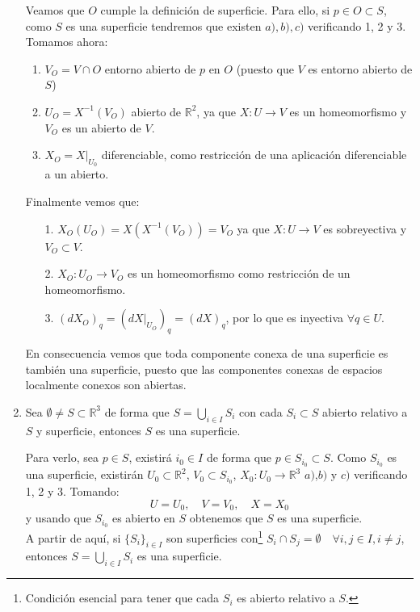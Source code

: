 \begin{ejemplo}
\begin{enumerate}
            Veamos que $O$ cumple la definición de superficie. Para ello, si $p\in O\subset S$, como $S$ es una superficie tendremos que existen $a),b),c)$ verificando 1, 2 y 3. Tomamos ahora:
            \begin{enumerate}[label=\alph*)]
                \item $V_O = V\cap O$ entorno abierto de $p$ en $O$ (puesto que $V$ es entorno abierto de $S$)
                \item $U_O = X^{-1}(V_O)$ abierto de $\mathbb{R}^2$, ya que $X:U\to V$ es un homeomorfismo y $V_O$ es un abierto de $V$.
                \item $X_O = X\big|_{U_0}$ diferenciable, como restricción de una aplicación diferenciable a un abierto.
            \end{enumerate}
            Finalmente vemos que:
            \begin{enumerate}
                \item[1.] $X_O(U_O) = X(X^{-1}(V_O)) = V_O$ ya que $X:U\to V$ es sobreyectiva y $V_O\subset V$.
                \item[2.] $X_O:U_O\to V_O$ es un homeomorfismo como restricción de un homeomorfismo.
                \item[3.] $(dX_O)_q = \left(dX\big|_{U_O}\right)_q = (dX)_q$, por lo que es inyectiva $\forall q\in U$.
            \end{enumerate}
            En consecuencia vemos que toda componente conexa de una superficie es también una superficie, puesto que las componentes conexas de espacios localmente conexos son abiertas.
        \item Sea $\emptyset \neq S\subset\mathbb{R}^3$ de forma que $S=\bigcup\limits_{i \in I}S_i$ con cada $S_i\subset S$ abierto relativo a $S$ y superficie, entonces $S$ es una superficie.

            Para verlo, sea $p\in S$, existirá $i_0\in I$ de forma que $p\in S_{i_0}\subset S$. Como $S_{i_0}$ es una superficie, existirán $U_0\subset\mathbb{R}^2$, $V_0\subset S_{i_0}$, $X_0:U_0\to\mathbb{R}^3$ $a)$,$b)$ y $c)$ verificando 1, 2 y 3. Tomando:
            \begin{equation*}
                U = U_0, \quad V = V_0, \quad X = X_0
            \end{equation*}
            y usando que $S_{i_0}$ es abierto en $S$ obtenemos que $S$ es una superficie.\\

            A partir de aquí, si $\{S_i\}_{i \in I}$ son superficies con\footnote{Condición esencial para tener que cada $S_i$ es abierto relativo a $S$.} $S_i\cap S_j = \emptyset \quad \forall i,j\in I, i\neq j$, entonces $S = \bigcup\limits_{i \in I}S_i$ es una superficie.


\end{enumerate}
\end{ejemplo}
